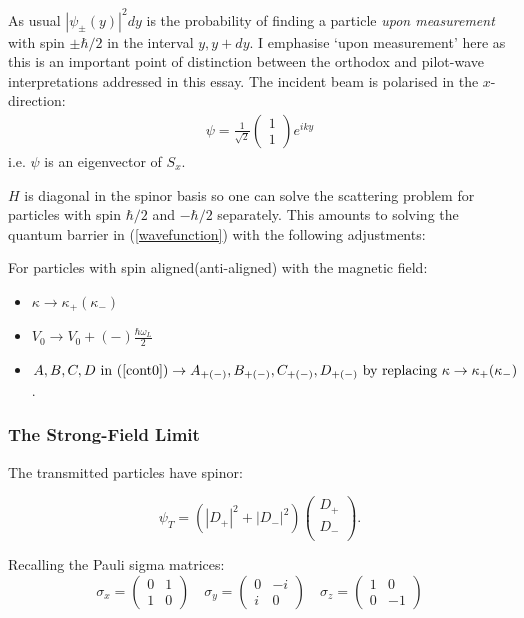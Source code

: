 \documentclass{article}
\begin{document}
As usual $|\psi_{\pm}(y)|^{2}dy$ is the probability of finding a particle \textit{upon measurement} with spin $\pm \hbar/2$ in the interval $y, y+dy$. I emphasise `upon measurement' here as this is an important point of distinction between the orthodox and pilot-wave interpretations addressed in this essay. The incident beam is polarised in the $x$-direction:
\begin{align}
	\psi = \frac{1}{\sqrt{2}}
	\begin{pmatrix}
	1\\
	1
	\end{pmatrix}
	e^{iky}
\end{align}
i.e. $\psi$ is an eigenvector of $S_{x}$.

\noindent $H$ is diagonal in the spinor basis so one can solve the scattering problem for particles with spin $\hbar/2$ and $-\hbar/2$ separately. This amounts to solving the quantum barrier in (\ref{wavefunction}) with the following adjustments:

For particles with spin aligned(anti-aligned) with the magnetic field:

\begin{itemize}
	\item $\kappa \to \kappa_{+}(\kappa_{-})$
	\item $V_0 \to V_0+(-)\frac{\hbar \omega_L}{2}$
	\item $A,B,C,D \text{ in } (\ref{cont0}) \to A_{+(-)},B_{+(-)},C_{+(-)},D_{+(-)} \text{ by replacing } \kappa \to \kappa_{+}(\kappa_{-})$.
\end{itemize}

\subsubsection{The Strong-Field Limit}
The transmitted particles have spinor:

\begin{equation}
	\psi_T = (|D_{+}|^2+|D_{-}|^2)
	\begin{pmatrix}
		D_{+}\\
		D_{-}\\
	\end{pmatrix}.
\end{equation}

\noindent Recalling the Pauli sigma matrices:
\begin{equation}
	\sigma_x = 
	\begin{pmatrix}
		0&1\\
		1&0
	\end{pmatrix} \quad
	\sigma_y = 
	\begin{pmatrix}
		0&-i\\
		i&0
	\end{pmatrix} \quad
	\sigma_z =
	\begin{pmatrix}
		1&0\\
		0&-1
	\end{pmatrix}
\end{equation}
\end{document}
